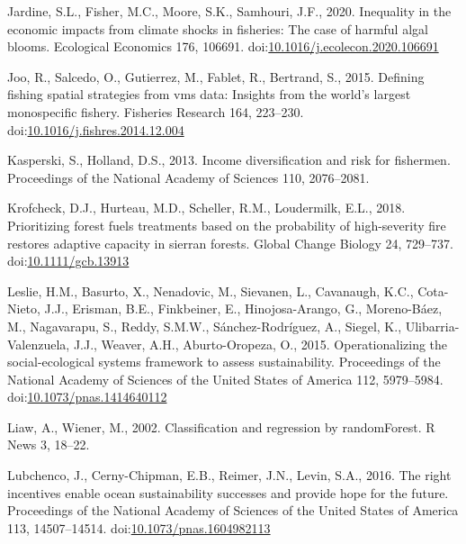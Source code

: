 \documentclass[]{elsarticle} %
\begin{document}
\leavevmode\hypertarget{ref-Jardine2020}{}%
Jardine, S.L., Fisher, M.C., Moore, S.K., Samhouri, J.F., 2020.
Inequality in the economic impacts from climate shocks in fisheries: The
case of harmful algal blooms. Ecological Economics 176, 106691.
doi:\href{https://doi.org/10.1016/j.ecolecon.2020.106691}{10.1016/j.ecolecon.2020.106691}

\leavevmode\hypertarget{ref-Joo2015}{}%
Joo, R., Salcedo, O., Gutierrez, M., Fablet, R., Bertrand, S., 2015.
Defining fishing spatial strategies from vms data: Insights from the
world's largest monospecific fishery. Fisheries Research 164, 223--230.
doi:\href{https://doi.org/10.1016/j.fishres.2014.12.004}{10.1016/j.fishres.2014.12.004}

\leavevmode\hypertarget{ref-Kasperski2013}{}%
Kasperski, S., Holland, D.S., 2013. Income diversification and risk for
fishermen. Proceedings of the National Academy of Sciences 110,
2076--2081.

\leavevmode\hypertarget{ref-Krofcheck2018}{}%
Krofcheck, D.J., Hurteau, M.D., Scheller, R.M., Loudermilk, E.L., 2018.
Prioritizing forest fuels treatments based on the probability of
high-severity fire restores adaptive capacity in sierran forests. Global
Change Biology 24, 729--737.
doi:\href{https://doi.org/10.1111/gcb.13913}{10.1111/gcb.13913}

\leavevmode\hypertarget{ref-Leslie2015}{}%
Leslie, H.M., Basurto, X., Nenadovic, M., Sievanen, L., Cavanaugh, K.C.,
Cota-Nieto, J.J., Erisman, B.E., Finkbeiner, E., Hinojosa-Arango, G.,
Moreno-Báez, M., Nagavarapu, S., Reddy, S.M.W., Sánchez-Rodríguez, A.,
Siegel, K., Ulibarria-Valenzuela, J.J., Weaver, A.H., Aburto-Oropeza,
O., 2015. Operationalizing the social-ecological systems framework to
assess sustainability. Proceedings of the National Academy of Sciences
of the United States of America 112, 5979--5984.
doi:\href{https://doi.org/10.1073/pnas.1414640112}{10.1073/pnas.1414640112}

\leavevmode\hypertarget{ref-Wiener2003}{}%
Liaw, A., Wiener, M., 2002. Classification and regression by
randomForest. R News 3, 18--22.

\leavevmode\hypertarget{ref-Lubchenco2016}{}%
Lubchenco, J., Cerny-Chipman, E.B., Reimer, J.N., Levin, S.A., 2016. The
right incentives enable ocean sustainability successes and provide hope
for the future. Proceedings of the National Academy of Sciences of the
United States of America 113, 14507--14514.
doi:\href{https://doi.org/10.1073/pnas.1604982113}{10.1073/pnas.1604982113}
\end{document}
